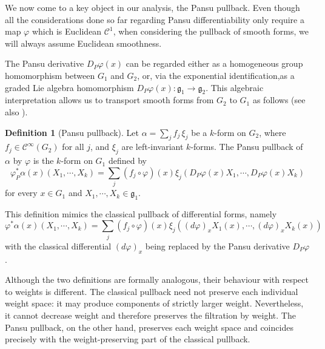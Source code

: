 \documentclass[dvipsnames]{amsart}
\theoremstyle{definition}
\newtheorem{definition}[theorem]{Definition}
\theoremstyle{definition}
\numberwithin{equation}{section}
\newcommand{\C}{\mathcal{C}}
\begin{document}
\medskip
We now come to a key object in our analysis, the Pansu pullback. Even though all the considerations done so far regarding Pansu differentiability only require a map $\varphi$ which is Euclidean $\C^1$, when considering the pullback of smooth forms, we will always assume Euclidean smoothness.

The Pansu derivative $D_P\varphi(x)$ can be regarded either as a homogeneous group homomorphism between $G_1$ and $G_2$, or, via the exponential identification,as a graded Lie algebra homomorphism $D_P\varphi(x) : \mathfrak{g}_1 \rightarrow \mathfrak{g}_2$.
This algebraic interpretation allows us to transport smooth forms from $G_2$ to $G_1$ as follows (see also \cite[Definition 3.14]{kleiner2020pansu}). 

\begin{definition}[Pansu pullback]\label{definition pansu pullback}
Let $\alpha = \sum_j f_j \,\xi_j$ be a $k$-form on $G_2$, where $f_j \in \mathcal{C}^{\infty}(G_2)$ for all $j$, and $\xi_j$ are left-invariant $k$-forms. The Pansu pullback of $\alpha$ by $\varphi$ is the $k$-form on $G_1$ defined by
\begin{equation*}
    \varphi_P^*\alpha(x)(X_1, \cdots, X_k) = \sum_{j} (f_j \circ \varphi )(x)  \xi_j (D_P\varphi(x) X_1, \cdots, D_P\varphi(x) X_k)
\end{equation*}
for every $x \in G_1$ and $X_1, \cdots, X_k \in \mathfrak{g}_1$.
\end{definition}
This definition mimics the classical pullback of differential forms, namely
\begin{equation*}
    \varphi^*\alpha(x)(X_1, \cdots, X_k) = \sum_{j} (f_j \circ \varphi )(x) \xi_j ((d\varphi)_x X_1(x), \cdots, (d\varphi)_x X_k(x))
\end{equation*}
with the classical differential $(d\varphi)_x$ being replaced by the Pansu derivative $D_P\varphi$.

Although the two definitions are formally analogous, their behaviour
with respect to weights is different. The classical pullback need not
preserve each individual weight space: it may produce components of
strictly larger weight. Nevertheless, it cannot decrease weight and
therefore preserves the filtration by weight. The Pansu pullback, on
the other hand, preserves each weight space and coincides precisely
with the weight-preserving part of the classical pullback.
\end{document}
